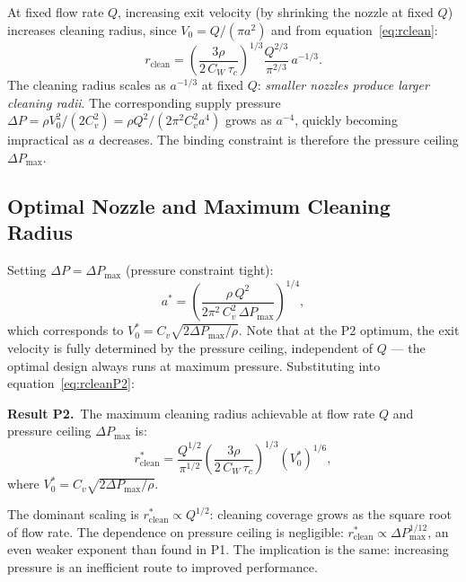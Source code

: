 \documentclass[aps,prfluids,reprint,amsmath,amssymb,floatfix]{revtex4-2}
\begin{document}
At fixed flow rate $Q$, increasing exit velocity (by shrinking the nozzle
at fixed $Q$) increases cleaning radius, since
$V_0 = Q/(\pi a^2)$ and from equation~\eqref{eq:rclean}:
\begin{equation}
  r_\mathrm{clean} = \left(\frac{3\rho}{2\,C_W\,\tau_c}\right)^{1/3}
  \frac{Q^{2/3}}{\pi^{2/3}}\,a^{-1/3}.
  \label{eq:rcleanP2}
\end{equation}
The cleaning radius scales as $a^{-1/3}$ at fixed $Q$: \emph{smaller
nozzles produce larger cleaning radii}. The corresponding supply pressure
$\Delta P = \rho V_0^2/(2C_v^2) = \rho Q^2/(2\pi^2 C_v^2 a^4)$ grows as
$a^{-4}$, quickly becoming impractical as $a$ decreases. The binding
constraint is therefore the pressure ceiling $\Delta P_\mathrm{max}$.

\subsection{Optimal Nozzle and Maximum Cleaning Radius}
\label{subsec:P2optimal}

Setting $\Delta P = \Delta P_\mathrm{max}$ (pressure constraint tight):
\begin{equation}
  a^* = \left(\frac{\rho\,Q^2}{2\pi^2\,C_v^2\,\Delta P_\mathrm{max}}\right)^{1/4},
  \label{eq:astarP2}
\end{equation}
which corresponds to $V_0^* = C_v\sqrt{2\Delta P_\mathrm{max}/\rho}$.
Note that at the P2 optimum, the exit velocity is fully determined by
the pressure ceiling, independent of $Q$ --- the optimal design always
runs at maximum pressure. Substituting into equation~\eqref{eq:rcleanP2}:

\begin{mdframed}[style=resultbox]
\textbf{Result P2.}\ The maximum cleaning radius achievable at flow
rate $Q$ and pressure ceiling $\Delta P_\mathrm{max}$ is:
\begin{equation}
  \boxed{r_\mathrm{clean}^* = \frac{Q^{1/2}}{\pi^{1/2}}
  \left(\frac{3\rho}{2\,C_W\,\tau_c}\right)^{1/3}
  (V_0^*)^{1/6},}
  \label{eq:rcleanstar}
\end{equation}
where $V_0^* = C_v\sqrt{2\Delta P_\mathrm{max}/\rho}$.
\end{mdframed}

The dominant scaling is $r_\mathrm{clean}^* \propto Q^{1/2}$: cleaning
coverage grows as the square root of flow rate. The dependence on pressure
ceiling is negligible: $r_\mathrm{clean}^* \propto \Delta P_\mathrm{max}^{1/12}$,
an even weaker exponent than found in P1. The implication is the same:
increasing pressure is an inefficient route to improved performance.
\end{document}
